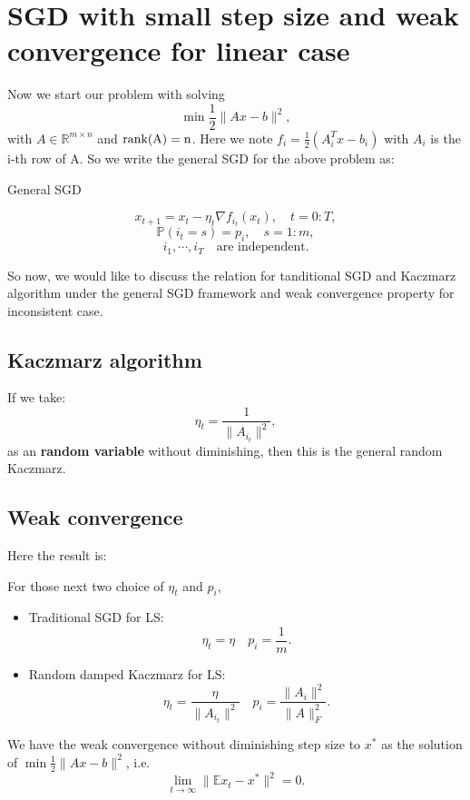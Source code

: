 \section{SGD with small step size and weak convergence for linear case}
Now we start our problem with solving 
\begin{equation}
\min \frac{1}{2}\|Ax - b\|^2,
\end{equation}
with $A \in \mathbb{R}^{m \times n}$ and $\rm{rank}(A) = n$.
Here we note $f_i = \frac{1}{2}(A_i^T x - b_i)$ with $A_i$ is the i-th row of A. So we write the general SGD for the above problem as:
\begin{algorithm}\caption{General SGD}
	\label{alg:gSGD}
	\begin{equation}\label{equ:sgd-iteration}
	x_{t+1} = x_{t} - \eta_t \nabla f_{i_t}(x_t), \quad t = 0:T,
	\end{equation}
	\begin{equation}
	\mathbb{P}(i_t = s) = p_i, \quad s = 1:m,
	\end{equation}
	\begin{equation}
	i_1, \cdots, i_T \quad \text{are independent}.
	\end{equation}
\end{algorithm}

So now, we would like to discuss the relation for tanditional SGD and Kaczmarz algorithm under the general SGD framework and weak convergence property for inconsistent case.

\subsection{Kaczmarz algorithm}
If we take:
\begin{equation}
\eta_t = \frac{1}{\|A_{i_t}\|^2},
\end{equation}
as an {\bf random variable} without diminishing, then this is the general random Kaczmarz. 

\subsection{Weak convergence}
Here the result is:
\begin{theorem}
	For those next two choice of $\eta_t$ and $p_i$, 
	\begin{itemize}
		\item Traditional SGD for LS:
		\begin{equation}
		\eta_t = \eta \quad p_i = \frac{1}{m}.
		\end{equation}
		\item Random damped Kaczmarz for LS:
		\begin{equation}
		\eta_t = \frac{\eta}{\|A_{i_t}\|^2} \quad p_i = \frac{\|A_i\|^2}{\|A\|_F^2}.
		\end{equation}
	\end{itemize}
	We have the weak convergence without diminishing step size to $x^*$ as the solution of $\min \frac{1}{2}\|Ax - b\|^2$, i.e.
	\begin{equation}
	\lim_{t \to \infty}\|\mathbb{E}x_t - x^*\|^2  = 0.
	\end{equation}
\end{theorem}

